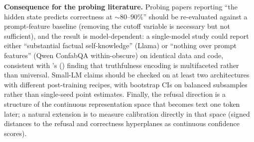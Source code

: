 \textbf{Consequence for the probing literature.} Probing papers
reporting ``the hidden state predicts correctness at
\(\sim 80\)--\(90\%\)'' should be re-evaluated against a prompt-feature
baseline (removing the cutoff variable is necessary but not sufficient),
and the result is model-dependent: a single-model study could
report either ``substantial factual self-knowledge'' (Llama) or
``nothing over prompt features'' (Qwen ConfabQA within-obscure) on
identical data and code, consistent with \citeauthor{orgad2024show}'s (\citeyear{orgad2024show}) finding
that truthfulness encoding is multifaceted rather than universal.
Small-LM claims should be checked on at least two architectures
with different post-training recipes, with bootstrap CIs on balanced
subsamples rather than single-seed point estimates. Finally, the refusal
direction is a structure of the continuous representation space that
becomes text one token later; a natural extension is to measure
calibration directly in that space (signed distances to the refusal and
correctness hyperplanes as continuous confidence scores).

